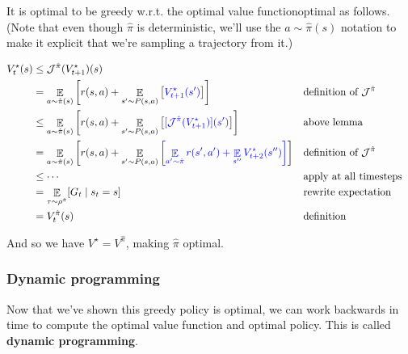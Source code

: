 \documentclass[../main/main]{subfiles}
\begin{document}
\begin{theorem}{It is optimal to be greedy w.r.t. the optimal value function}{optimal}
    as follows. (Note that even though $\hat \pi$ is deterministic, we'll use the $a \sim \hat \pi(s)$ notation to make it explicit that we're sampling a trajectory from it.)
    
    \begin{align*}
    V_{t}^{\star}(s) &\le \mathcal{J}^{\hat \pi}(V_{t+1}^{\star})(s) \\
    &= \mathop{\mathbb{E}}_{a \sim \hat \pi(s)} \left[ r(s, a) + \mathop{\mathbb{E}}_{s' \sim P(s, a)} \left[ {\color{blue} V_{t+1}^{\star}(s')} \right] \right] && \text{definition of } \mathcal{J}^{\hat \pi} \\
    &\le \mathop{\mathbb{E}}_{a \sim \hat \pi(s)} \left[ r(s, a) + \mathop{\mathbb{E}}_{s' \sim P(s, a)} \left[ {\color{blue}[ \mathcal{J}^{\hat \pi} (V_{t+1}^{\star})] (s')} \right] \right] && \text{above lemma} \\
    &= \mathop{\mathbb{E}}_{a \sim \hat \pi(s)} \left[ r(s, a) + \mathop{\mathbb{E}}_{s' \sim P(s, a)}{\color{blue} \left[ \mathop{\mathbb{E}}_{a' \sim \hat \pi}  r(s', a') + \mathop{\mathbb{E}}_{s''} V_{t+2}^{\star}(s'') \right]} \right] && \text{definition of } \mathcal{J}^{\hat \pi} \\
    &\le \cdots && \text{apply at all timesteps} \\
    &= \mathop{\mathbb{E}}_{\tau \sim \rho^{\hat \pi}} [G_{t} \mid s_t = s] && \text{rewrite expectation} \\
    &= V_{t}^{\hat \pi}(s) && \text{definition}
    \end{align*}

    And so we have $V^{\star} = V^{\hat \pi}$, making $\hat \pi$ optimal.
\end{theorem}


\subsubsection{Dynamic programming}

Now that we've shown this greedy policy is optimal, we can work backwards in time to compute the optimal value function and optimal policy. This is called \textbf{dynamic programming}.
\end{document}
